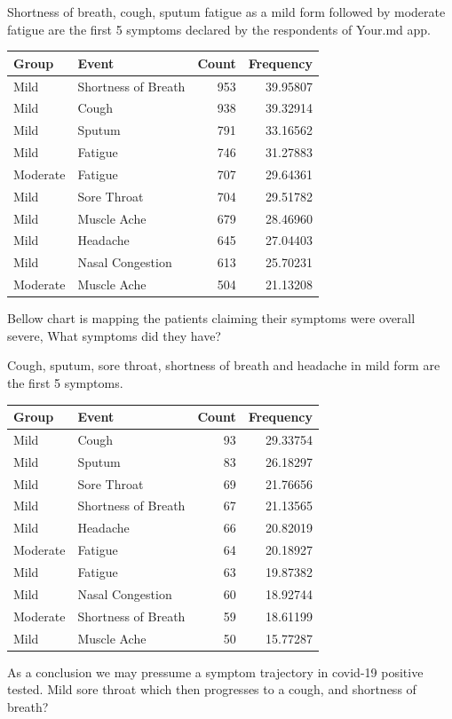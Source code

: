 \documentclass[
]{article}
\begin{document}
\hypertarget{htmlwidget-a0233c8e1c70406533cc}{}
\begin{plotly}

\end{plotly}

Shortness of breath, cough, sputum fatigue as a mild form followed by
moderate fatigue are the first 5 symptoms declared by the respondents of
Your.md app.

\begin{longtable}[]{@{}llrr@{}}
\toprule
Group & Event & Count & Frequency\tabularnewline
\midrule
\endhead
Mild & Shortness of Breath & 953 & 39.95807\tabularnewline
Mild & Cough & 938 & 39.32914\tabularnewline
Mild & Sputum & 791 & 33.16562\tabularnewline
Mild & Fatigue & 746 & 31.27883\tabularnewline
Moderate & Fatigue & 707 & 29.64361\tabularnewline
Mild & Sore Throat & 704 & 29.51782\tabularnewline
Mild & Muscle Ache & 679 & 28.46960\tabularnewline
Mild & Headache & 645 & 27.04403\tabularnewline
Mild & Nasal Congestion & 613 & 25.70231\tabularnewline
Moderate & Muscle Ache & 504 & 21.13208\tabularnewline
\bottomrule
\end{longtable}

Bellow chart is mapping the patients claiming their symptoms were
overall severe, What symptoms did they have?

\hypertarget{htmlwidget-50c159696e76c2e39b52}{}
\begin{plotly}

\end{plotly}

Cough, sputum, sore throat, shortness of breath and headache in mild
form are the first 5 symptoms.

\begin{longtable}[]{@{}llrr@{}}
\toprule
Group & Event & Count & Frequency\tabularnewline
\midrule
\endhead
Mild & Cough & 93 & 29.33754\tabularnewline
Mild & Sputum & 83 & 26.18297\tabularnewline
Mild & Sore Throat & 69 & 21.76656\tabularnewline
Mild & Shortness of Breath & 67 & 21.13565\tabularnewline
Mild & Headache & 66 & 20.82019\tabularnewline
Moderate & Fatigue & 64 & 20.18927\tabularnewline
Mild & Fatigue & 63 & 19.87382\tabularnewline
Mild & Nasal Congestion & 60 & 18.92744\tabularnewline
Moderate & Shortness of Breath & 59 & 18.61199\tabularnewline
Mild & Muscle Ache & 50 & 15.77287\tabularnewline
\bottomrule
\end{longtable}

As a conclusion we may pressume a symptom trajectory in covid-19
positive tested. Mild sore throat which then progresses to a cough, and
shortness of breath?
\end{document}
